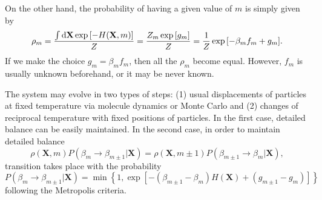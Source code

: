 On the other hand, the probability of having a given value of $m$ is simply given by
\begin{equation}
    \rho_m=\frac{\int\mathop{}\!\mathrm{d} \mathbf{X} \exp{\left[-H(\mathbf{X},m)\right]}}{Z}=\frac{Z_m\exp{[g_m]}}{Z}=\frac{1}{Z}\exp{[-\beta_m f_m+g_m]}.
\end{equation}
If we make the choice $g_m=\beta_m f_m$, then all the $\rho_m$ become equal. However, $f_m$ is usually unknown beforehand, or it may be never known.

The system may evolve in two types of steps: (1) usual displacements of particles at fixed temperature via molecule dynamics or Monte Carlo and (2) changes of reciprocal temperature with fixed positions of particles. In the first case, detailed balance can be easily maintained. In the second case, in order to maintain detailed balance
\begin{equation}
    \rho(\mathbf{X},m)P(\beta_m\to \beta_{m\pm 1}|\mathbf{X})=\rho(\mathbf{X},m\pm 1)P(\beta_{m\pm 1}\to \beta_{m}|\mathbf{X}),
\end{equation}
transition takes place with the probability
\begin{equation}
    P(\beta_m\to \beta_{m\pm 1}|\mathbf{X})=\min{\left\{1,\exp{\left[-(\beta_{m\pm1}-\beta_m)H(\mathbf{X})+(g_{m\pm1}-g_m)\right]}\right\}}
\end{equation}
following the Metropolis criteria.